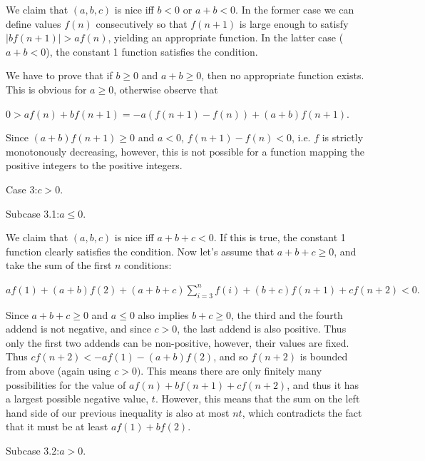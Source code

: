 \documentclass{article}
\begin{document}
We claim that \(\displaystyle (a,b,c)\) is nice iff \(\displaystyle b<0\) or \(\displaystyle a+b<0\).  In the former case we can define values \(\displaystyle f(n)\) consecutively so that \(\displaystyle f(n+1)\) is large enough to satisfy \(\displaystyle |bf(n+1)|>af(n)\), yielding an appropriate function. In the latter case (\(\displaystyle a+b<0\)), the constant 1 function satisfies the condition.

We have to prove that if \(\displaystyle b\ge 0\) and \(\displaystyle a+b\ge 0\), then no appropriate function exists. This is obvious for \(\displaystyle a\ge 0\), otherwise observe that

\(\displaystyle 0>af(n)+bf(n+1)=-a(f(n+1)-f(n))+(a+b)f(n+1).\)

Since \(\displaystyle (a+b)f(n+1)\ge 0\) and \(\displaystyle a<0\), \(\displaystyle f(n+1)-f(n)<0\), i.e. \(\displaystyle f\) is strictly monotonously decreasing, however, this is not possible for a function mapping the positive integers to the positive integers.

Case 3:\(\displaystyle c>0\).

Subcase 3.1:\(\displaystyle a\le 0\).

We claim that \(\displaystyle (a,b,c)\) is nice iff \(\displaystyle a+b+c<0\). If this is true, the constant 1 function clearly satisfies the condition. Now let's assume that \(\displaystyle a+b+c\ge 0\), and take the sum of the first \(\displaystyle n\) conditions:

\(\displaystyle af(1)+(a+b)f(2)+(a+b+c)\sum\limits_{i=3}^n f(i)+(b+c)f(n+1)+cf(n+2)<0.\)

Since \(\displaystyle a+b+c\ge 0\) and \(\displaystyle a\le 0\) also implies \(\displaystyle b+c\ge 0\), the third and the fourth addend is not negative, and since \(\displaystyle c>0\), the last addend is also positive. Thus only the first two addends can be non-positive, however, their values are fixed. Thus \(\displaystyle cf(n+2)<-af(1)-(a+b)f(2)\), and so \(\displaystyle f(n+2)\) is bounded from above (again using \(\displaystyle c>0)\). This means there are only finitely many possibilities for the value of \(\displaystyle af(n)+bf(n+1)+cf(n+2)\), and thus it has a largest possible negative value, \(\displaystyle t\). However, this means that the sum on the left hand side of our previous inequality is also at most \(\displaystyle nt\), which contradicts the fact that it must be at least \(\displaystyle af(1)+bf(2)\).

Subcase 3.2:\(\displaystyle a>0\).
\end{document}
